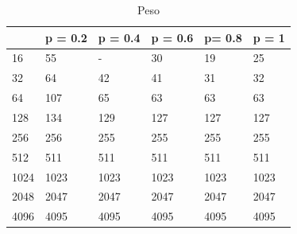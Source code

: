 \documentclass[]{article}
\begin{document}
\begin{table}[H]
\centering
\caption{Peso}
\label{tab:mst_weight}
\begin{tabular}{|l|l|l|l|l|l|} 
\cline{2-6}
\multicolumn{1}{l|}{} & p = 0.2 & p = 0.4 & p = 0.6 & p= 0.8 & p = 1  \\ 
\hline
16                    & 55      & -       & 30      & 19     & 25     \\
32                    & 64      & 42      & 41      & 31     & 32     \\
64                    & 107     & 65      & 63      & 63     & 63     \\
128                   & 134     & 129     & 127     & 127    & 127    \\
256                   & 256     & 255     & 255     & 255    & 255    \\
512                   & 511     & 511     & 511     & 511    & 511    \\
1024                  & 1023    & 1023    & 1023    & 1023   & 1023   \\
2048                  & 2047    & 2047    & 2047    & 2047   & 2047   \\
4096                  & 4095    & 4095    & 4095    & 4095   & 4095   \\
\hline
\end{tabular}
\end{table}
\end{document}
